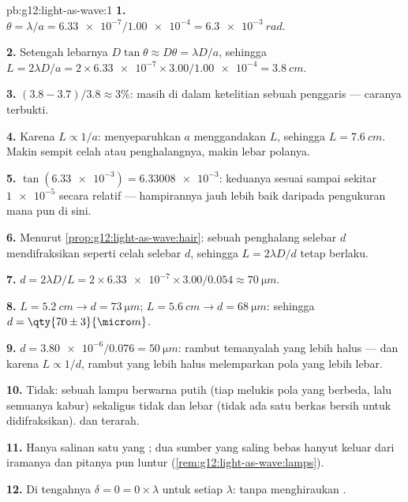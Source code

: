\begin{solution}{pb:g12:light-as-wave:1}
\textbf{1.} $\theta = \lambda/a = \num{6.33e-7}/\num{1.00e-4} =
\qty{6.3e-3}{rad}$.

\textbf{2.} Setengah lebarnya $D\tan\theta \approx D\theta = \lambda D/a$,
sehingga $L = 2\lambda D/a = 2 \times \num{6.33e-7} \times
3.00/\num{1.00e-4} = \qty{3.8}{cm}$.

\textbf{3.} $(3.8 - 3.7)/3.8 \approx 3\%$: masih di dalam ketelitian
sebuah penggaris --- caranya terbukti.

\textbf{4.} Karena $L \propto 1/a$: menyeparuhkan $a$ menggandakan $L$,
sehingga $L = \qty{7.6}{cm}$. Makin sempit celah atau penghalangnya,
makin lebar polanya.

\textbf{5.} $\tan(\num{6.33e-3}) = \num{6.33008e-3}$: keduanya sesuai
sampai sekitar $\num{1e-5}$ secara relatif --- hampirannya jauh lebih
baik daripada pengukuran mana pun di sini.

\textbf{6.} Menurut \cref{prop:g12:light-as-wave:hair}: sebuah
penghalang selebar $d$ mendifraksikan seperti celah selebar $d$,
sehingga $L = 2\lambda D/d$ tetap berlaku.

\textbf{7.} $d = 2\lambda D/L = 2 \times \num{6.33e-7} \times
3.00/0.054 \approx \qty{70}{\micro m}$.

\textbf{8.} $L = \qty{5.2}{cm} \to d = \qty{73}{\micro m}$;
$L = \qty{5.6}{cm} \to d = \qty{68}{\micro m}$: sehingga
$d = \qty{70 \pm 3}{\micro m}$.

\textbf{9.} $d = \num{3.80e-6}/0.076 = \qty{50}{\micro m}$: rambut
temanyalah yang lebih halus --- dan karena $L \propto 1/d$, rambut yang
lebih halus melemparkan pola yang lebih lebar.

\textbf{10.} Tidak: sebuah lampu berwarna putih (tiap  melukis pola yang berbeda, lalu semuanya kabur) sekaligus
tidak  dan lebar (tidak ada satu berkas bersih untuk
didifraksikan).   dan terarah.

\textbf{11.} Hanya salinan satu  yang ; dua sumber yang
saling bebas hanyut keluar dari iramanya dan pitanya pun luntur
(\cref{rem:g12:light-as-wave:lamps}).

\textbf{12.} Di tengahnya $\delta = 0 = 0 \times \lambda$ untuk setiap
$\lambda$:  tanpa menghiraukan .


\end{solution}
